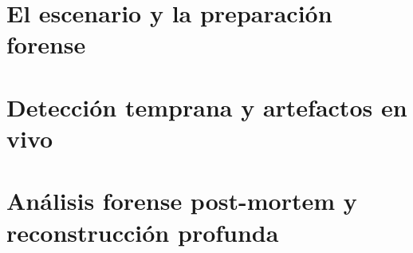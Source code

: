 \documentclass[10pt,twoside,openright]{book}
\begin{document}
\frontmatter
\pagestyle{plain}


\cleardoublepage


\cleardoublepage


\cleardoublepage


\cleardoublepage


\cleardoublepage


\cleardoublepage

\tableofcontents
\cleardoublepage

\mainmatter
\pagestyle{fancy}

\part{El escenario y la preparación forense}




\part{Detección temprana y artefactos en vivo}





\part{Análisis forense post-mortem y reconstrucción profunda}









\end{document}

